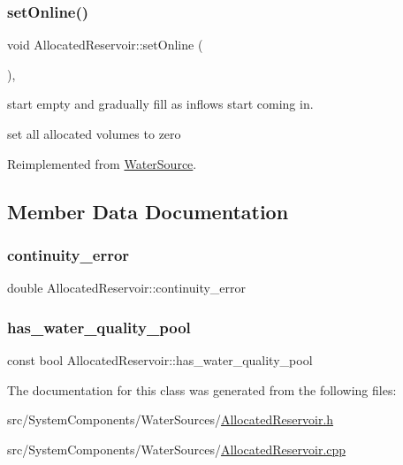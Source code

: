 \subsubsection{\texorpdfstring{set\+Online()}{setOnline()}}
{\footnotesize\ttfamily void Allocated\+Reservoir\+::set\+Online (\begin{DoxyParamCaption}{ }\end{DoxyParamCaption})\hspace{0.3cm}{\ttfamily [override]}, {\ttfamily [virtual]}}

start empty and gradually fill as inflows start coming in.

set all allocated volumes to zero 

Reimplemented from \mbox{\hyperlink{classWaterSource_ab3396e2915db91a6c82e0f29c7889df4}{Water\+Source}}.



\subsection{Member Data Documentation}
\mbox{\label{classAllocatedReservoir_ae34d7123ff096d676609e32ba4b83e47}} 
\subsubsection{\texorpdfstring{continuity\+\_\+error}{continuity\_error}}
{\footnotesize\ttfamily double Allocated\+Reservoir\+::continuity\+\_\+error\hspace{0.3cm}{\ttfamily [protected]}}

\mbox{\label{classAllocatedReservoir_af6a1924f60de19b7f77781af0419c39b}} 
\subsubsection{\texorpdfstring{has\+\_\+water\+\_\+quality\+\_\+pool}{has\_water\_quality\_pool}}
{\footnotesize\ttfamily const bool Allocated\+Reservoir\+::has\+\_\+water\+\_\+quality\+\_\+pool\hspace{0.3cm}{\ttfamily [protected]}}



The documentation for this class was generated from the following files\+:\begin{DoxyCompactItemize}
\item 
src/\+System\+Components/\+Water\+Sources/\mbox{\hyperlink{AllocatedReservoir_8h}{Allocated\+Reservoir.\+h}}\item 
src/\+System\+Components/\+Water\+Sources/\mbox{\hyperlink{AllocatedReservoir_8cpp}{Allocated\+Reservoir.\+cpp}}\end{DoxyCompactItemize}
